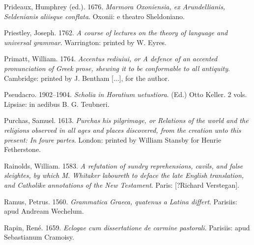 \begin{styleStandard}
Prideaux, Humphrey (ed.). 1676. \textit{Marmora Oxoniensia, ex Arundellianis, Seldenianis aliisque conflata}. Oxonii: e theatro Sheldoniano.
\end{styleStandard}

\begin{styleStandard}
Priestley, Joseph. 1762. \textit{A course of lectures on the theory of language and universal grammar}. Warrington: printed by W. Eyres.
\end{styleStandard}

\begin{styleStandard}
Primatt, William. 1764. \textit{Accentus rediuiui, or A defence of an accented pronunciation of Greek prose, shewing it to be conformable to all antiquity}. Cambridge: printed by J. Bentham [...], for the author.
\end{styleStandard}

\begin{styleStandard}
Pseudacro. 1902–1904. \textit{Scholia in Horatium uetustiora}. (Ed.) Otto Keller. 2 vols. Lipsiae: in aedibus B. G. Teubneri.
\end{styleStandard}

\begin{styleStandard}
Purchas, Samuel. 1613. \textit{Purchas his pilgrimage, or Relations of the world and the religions observed in all ages and places discovered, from the creation unto this present: In foure partes}. London: printed by William Stansby for Henrie Fetherstone.
\end{styleStandard}

\begin{styleStandard}
Rainolds, William. 1583. \textit{A refutation of sundry reprehensions, cavils, and false sleightes, by which M. Whitaker laboureth to deface the late English translation, and Catholike annotations of the New Testament}. Paris: [?Richard Verstegan].
\end{styleStandard}

\begin{styleStandard}
Ramus, Petrus. 1560. \textit{Grammatica Graeca, quatenus a Latina differt}. Parisiis: apud Andream Wechelum.
\end{styleStandard}

\begin{styleStandard}
Rapin, René. 1659. \textit{Eclogae cum dissertatione de carmine pastorali}. Parisiis: apud Sebastianum Cramoisy.
\end{styleStandard}

